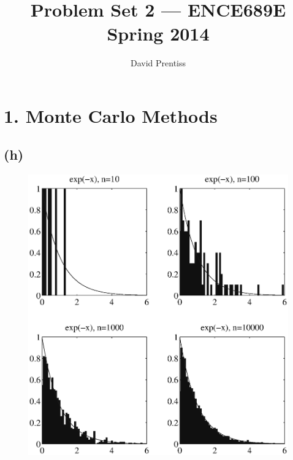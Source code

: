 \documentclass[fleqn, letterpaper]{tufte-handout}
\title{Problem Set 2 --- ENCE689E Spring 2014}
\author{David Prentiss}
\begin{document}
\maketitle


\section{1. Monte Carlo Methods}
\subsection{(h)}
\begin{figure}[h!]
        \includegraphics[width=\textwidth]{problem1}
\end{figure}
\end{document}
